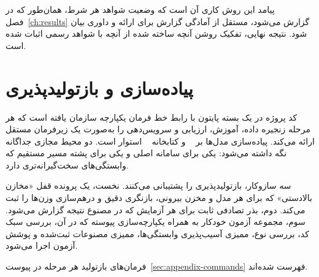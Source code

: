 پیامد این روش کاری آن است که وضعیت شواهد هر شرط، همان‌طور که در
فصل~\ref{ch:results} گزارش می‌شود، مستقل از آمادگی گزارش برای ارائه و
داوری بیان شود. نتیجه نهایی، تفکیک روشن آنچه ساخته شده از آنچه با شواهد
رسمی اثبات شده است.

\section{پیاده‌سازی و بازتولیدپذیری}
\label{sec:impl}

کد پروژه در یک بسته پایتون با رابط خط فرمان یکپارچه سازمان یافته است که
هر مرحله زنجیره داده، آموزش، ارزیابی و سرویس‌دهی را به‌صورت یک زیرفرمان
مستقل ارائه می‌کند. پیاده‌سازی مدل‌ها بر ~\cite{paszke2019pytorch}
و کتابخانه ~\cite{wolf2020transformers} استوار است. دو محیط مجازی جداگانه نگه داشته می‌شود: یکی برای
سامانه اصلی و یکی برای پشته مسیر مستقیم که وابستگی‌های سخت‌گیرانه‌تری
دارد.

سه سازوکار، بازتولیدپذیری را پشتیبانی می‌کنند. نخست، یک پرونده قفل
«مخازن بالادستی» که برای هر مدل و مخزن بیرونی، بازنگری دقیق و
درهم‌سازی وزن‌ها را ثبت می‌کند. دوم، بذر تصادفی ثابت برای هر آزمایش که در
مصنوع نتیجه گزارش می‌شود. سوم، مجموعه آزمون خودکار به همراه یکپارچه‌سازی
پیوسته که در آن، بررسی سبک کد، بررسی نوع، ممیزی آسیب‌پذیری وابستگی‌ها،
ممیزی مصنوعات ثبت‌شده و پوشش آزمون اجرا می‌شود.

فرمان‌های بازتولید هر مرحله در پیوست~\ref{sec:appendix-commands} فهرست شده‌اند.
